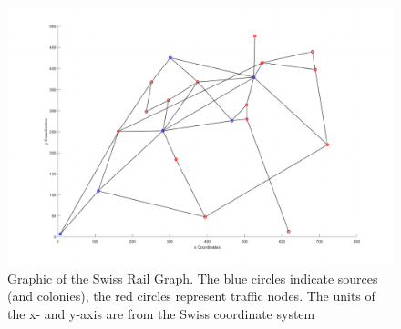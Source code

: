 \begin{figure}[H]
	\centering
	\includegraphics[scale=0.8]{sbbEmpty.pdf}
	\caption{Graphic of the Swiss Rail Graph. The blue circles indicate sources (and colonies), the red circles represent traffic nodes. The units of the x- and y-axis are from the Swiss coordinate system}
\end{figure}

